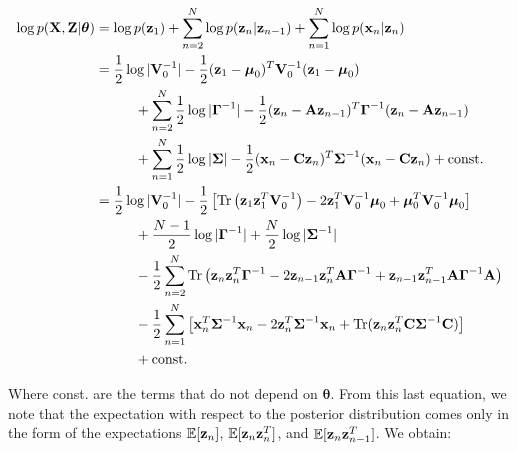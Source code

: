 \documentclass[11pt]{article}
\numberwithin{equation}{section}
\newcommand{\x}{{\bf x}}
\newcommand{\z}{{\bf z}}
\begin{document}
\begin{align}
	\log p({\bf X}, {\bf Z}\vert \boldsymbol\theta) &= \log p(\z_1) + \sum_{n=2}^N \log p(\z_n\vert \z_{n-1}) + \sum_{n=1}^N \log p(\x_n\vert \z_n)\\
	   &=\frac{1}{2}\log\vert{\bf V}_0^{-1}\vert - \frac{1}{2}(\z_1 - \boldsymbol\mu_0)^T{\bf V}_0^{-1}(\z_1 - \boldsymbol\mu_0) \nonumber \\
	   &\hspace{1cm}+ \sum_{n=2}^N \frac{1}{2}\log\vert\boldsymbol\Gamma^{-1}\vert - \frac{1}{2}(\z_n - {\bf A z}_{n-1})^T\boldsymbol{\Gamma}^{-1}(\z_n - {\bf A z}_{n-1}) \nonumber \\
	   &\hspace{1cm}+\sum_{n=1}^N \frac{1}{2}\log\vert\boldsymbol\Sigma\vert -\frac{1}{2}(\x_n - {\bf C z}_n)^T \boldsymbol{\Sigma}^{-1}(\x_n - {\bf C z}_n) + \text{const.}\\
	   &= \frac{1}{2}\log \vert
	  {\bf V}_0^{-1}\vert -\frac{1}{2}\left[\text{Tr}\left(\z_1 \z_1^T {\bf V}_0^{-1}\right) -2 \z_1^T{\bf V}_0^{-1}\boldsymbol\mu_0 + \boldsymbol\mu_0^T {\bf V}_0^{-1}\boldsymbol\mu_0\right] \nonumber \\
	  &\hspace{1cm}+ \frac{N-1}{2}\log\vert\boldsymbol\Gamma^{-1}\vert + \frac{N}{2}\log\vert \boldsymbol\Sigma^{-1}\vert \nonumber \\
	  &\hspace{1cm}-\frac{1}{2} \sum_{n=2}^{N}\text{Tr}\left(\z_n\z_n^T\boldsymbol\Gamma^{-1} -2 \z_{n-1}\z_n^T{\bf A}\boldsymbol\Gamma^{-1} +  \z_{n-1}\z_{n-1}^T{\bf A}\boldsymbol\Gamma^{-1}{\bf A}\right) \nonumber\\
	  &\hspace{1cm}-\frac{1}{2}\sum_{n=1}^N\left[\x_n^T\boldsymbol{\Sigma}^{-1}\x_n-2\z_n^T\boldsymbol\Sigma^{-1}\x_n + \text{Tr}(\z_n\z_n^T{\bf C}\boldsymbol\Sigma^{-1}{\bf C})\right] \nonumber\\
	  &\hspace{1cm} + \text{const.}
\end{align}

Where const. are the terms that do not depend on $\boldsymbol{\theta}$. From this last equation, we note that the expectation with respect to the posterior distribution comes only in the form of the expectations $\mathbb{E}[\z_n]$, $\mathbb{E}[\z_n\z_{n}^{T}]$, and  $\mathbb{E}[\z_n\z_{n-1}^{T}]$. We obtain:
\end{document}

